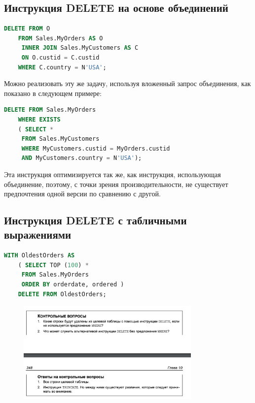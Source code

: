 \subsection{Инструкция DELETE на основе объединений}

\begin{lstlisting}[label=lst:funcReturn, language=sql]
	DELETE FROM O
	FROM Sales.MyOrders AS O
	 INNER JOIN Sales.MyCustomers AS C
	 ON O.custid = C.custid
	WHERE C.country = N'USA';
\end{lstlisting}

Можно реализовать эту же задачу, используя вложенный запрос объединения, как
показано в следующем примере: 

\begin{lstlisting}[label=lst:funcReturn, language=sql]
	DELETE FROM Sales.MyOrders
	WHERE EXISTS
	( SELECT *
	 FROM Sales.MyCustomers
	 WHERE MyCustomers.custid = MyOrders.custid
	 AND MyCustomers.country = N'USA'); 
\end{lstlisting}

Эта инструкция оптимизируется так же, как инструкция, использующая объединение, поэтому, с точки зрения производительности, не существует предпочтения одной версии по сравнению с другой.


\subsection{Инструкция DELETE с табличными выражениями}

\begin{lstlisting}[label=lst:funcReturn, language=sql]
	WITH OldestOrders AS
	( SELECT TOP (100) *
	 FROM Sales.MyOrders
	 ORDER BY orderdate, ordered )
	DELETE FROM OldestOrders; 
\end{lstlisting}


\begin{figure}[h!]
	\begin{center}
		\includegraphics[width=0.8\textwidth]{img/control23.png}
	\end{center}
	\captionsetup{justification=centering}
\end{figure}



